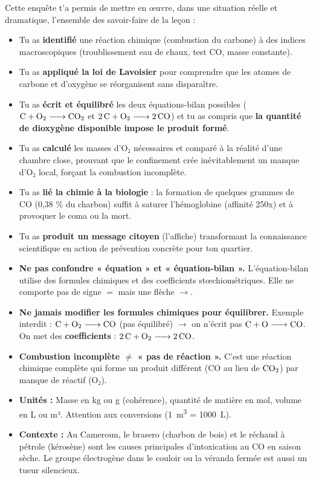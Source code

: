 \documentclass[11pt]{article}
\newcounter{popsec}
\newcounter{popsub}
\newcommand{\courssub}[1]{%
  \stepcounter{popsub}%
  \par\vspace{9pt}\noindent{\popxbold\fontsize{11.5}{13}\selectfont\color{popink}{\color{poporange}\thepopsec.\thepopsub}\hspace{6pt}#1}\par\nopagebreak\vspace{4pt}
}
\begin{document}
\courssub{Bilan de l'activité}
Cette enquête t'a permis de mettre en œuvre, dans une situation réelle et dramatique, l'ensemble des savoir-faire de la leçon :
\begin{itemize}
    \item Tu as \textbf{identifié} une réaction chimique (combustion du carbone) à des indices macroscopiques (troublissement eau de chaux, test CO, masse constante).
    \item Tu as \textbf{appliqué la loi de Lavoisier} pour comprendre que les atomes de carbone et d'oxygène se réorganisent sans disparaître.
    \item Tu as \textbf{écrit et équilibré} les deux équations-bilan possibles ($\ce{C + O2 -> CO2}$ et $\ce{2C + O2 -> 2CO}$) et tu as compris que \textbf{la quantité de dioxygène disponible impose le produit formé}.
    \item Tu as \textbf{calculé} les masses d'O₂ nécessaires et comparé à la réalité d'une chambre close, prouvant que le confinement crée inévitablement un manque d'O₂ local, forçant la combustion incomplète.
    \item Tu as \textbf{lié la chimie à la biologie} : la formation de quelques grammes de CO (0,38 \% du charbon) suffit à saturer l'hémoglobine (affinité 250x) et à provoquer le coma ou la mort.
    \item Tu as \textbf{produit un message citoyen} (l'affiche) transformant la connaissance scientifique en action de prévention concrète pour ton quartier.
\end{itemize}

\begin{attention}
\begin{itemize}
    \item \textbf{Ne pas confondre « équation » et « équation-bilan ».} L'équation-bilan utilise des formules chimiques et des coefficients stœchiométriques. Elle ne comporte pas de signe $=$ mais une flèche $\rightarrow$.
    \item \textbf{Ne jamais modifier les formules chimiques pour équilibrer.} Exemple interdit : $\ce{C + O2 -> CO}$ (pas équilibré) $\rightarrow$ on n'écrit pas $\ce{C + O -> CO}$. On met des \textbf{coefficients} : $\ce{2C + O2 -> 2CO}$.
    \item \textbf{Combustion incomplète $\neq$ « pas de réaction ».} C'est une réaction chimique complète qui forme un produit différent (CO au lieu de $\ce{CO2}$) par manque de réactif (O₂).
    \item \textbf{Unités :} Masse en kg ou g (cohérence), quantité de matière en mol, volume en L ou m³. Attention aux conversions (\SI{1}{\cubic\meter} = \SI{1000}{L}).
    \item \textbf{Contexte :} Au Cameroun, le brasero (charbon de bois) et le réchaud à pétrole (kérosène) sont les causes principales d'intoxication au CO en saison sèche. Le groupe électrogène dans le couloir ou la véranda fermée est aussi un tueur silencieux.
\end{itemize}
\end{attention}
\end{document}
